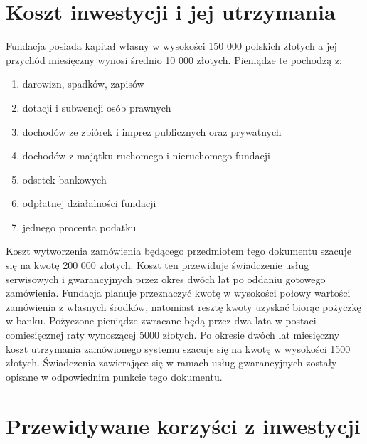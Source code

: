 \documentclass{article}
\begin{document}
\section{Koszt inwestycji i jej utrzymania}
Fundacja posiada kapitał własny w wysokości 150 000 polskich złotych a jej przychód miesięczny wynosi średnio 10 000 złotych. Pieniądze te pochodzą z:
\begin{enumerate}
	\item darowizn, spadków, zapisów
	\item dotacji i subwencji osób prawnych
	\item dochodów ze zbiórek i imprez publicznych oraz prywatnych
	\item dochodów z majątku ruchomego i nieruchomego fundacji
	\item odsetek bankowych
	\item odpłatnej działalności fundacji
	\item jednego procenta podatku
\end{enumerate}
Koszt wytworzenia zamówienia będącego przedmiotem tego dokumentu szacuje się na kwotę 200 000 złotych. Koszt ten przewiduje świadczenie usług serwisowych i gwarancyjnych przez okres dwóch lat po oddaniu gotowego zamówienia. Fundacja planuje przeznaczyć kwotę w wysokości połowy wartości zamówienia z własnych środków, natomiast resztę kwoty uzyskać biorąc pożyczkę w banku. Pożyczone pieniądze zwracane będą przez dwa lata w postaci comiesięcznej raty wynoszącej 5000 złotych. Po okresie dwóch lat miesięczny koszt utrzymania zamówionego systemu szacuje się na kwotę w wysokości 1500 złotych. Świadczenia zawierające się w ramach usług gwarancyjnych zostały opisane w odpowiednim punkcie tego dokumentu.

\section{Przewidywane korzyści z inwestycji}
\end{document}
